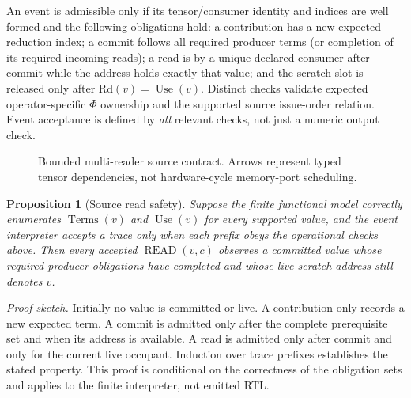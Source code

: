 \documentclass{article}
\newtheorem{proposition}{Proposition}
\begin{document}
An event is admissible only if its tensor/consumer identity and indices are well formed and the following obligations hold: a contribution has a new expected reduction index; a commit follows all required producer terms (or completion of its required incoming reads); a read is by a unique declared consumer after commit while the address holds exactly that value; and the scratch slot is released only after $\mathrm{Rd}(v)=\operatorname{Use}(v)$. Distinct checks validate expected operator-specific $\Phi$ ownership and the supported source issue-order relation. Event acceptance is defined by \emph{all} relevant checks, not just a numeric output check.

\begin{figure}[t]
\centering
{}
\caption{Bounded multi-reader source contract. Arrows represent typed tensor dependencies, not hardware-cycle memory-port scheduling.}
\label{fig:fanout}
\end{figure}


\begin{proposition}[Source read safety]
Suppose the finite functional model correctly enumerates $\operatorname{Terms}(v)$ and $\operatorname{Use}(v)$ for every supported value, and the event interpreter accepts a trace only when each prefix obeys the operational checks above. Then every accepted $\operatorname{READ}(v,c)$ observes a committed value whose required producer obligations have completed and whose live scratch address still denotes $v$.
\end{proposition}
\noindent\emph{Proof sketch.} Initially no value is committed or live. A contribution only records a new expected term. A commit is admitted only after the complete prerequisite set and when its address is available. A read is admitted only after commit and only for the current live occupant. Induction over trace prefixes establishes the stated property. This proof is conditional on the correctness of the obligation sets and applies to the finite interpreter, not emitted RTL.\par
\end{document}
